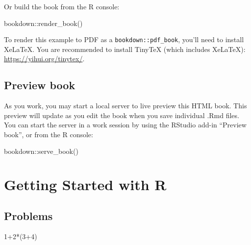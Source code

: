 \documentclass[
]{book}
\newenvironment{Shaded}{\begin{snugshade}}{\end{snugshade}}
\newcommand{\DecValTok}[1]{\textcolor[rgb]{0.00,0.00,0.81}{#1}}
\newcommand{\FunctionTok}[1]{\textcolor[rgb]{0.00,0.00,0.00}{#1}}
\newcommand{\NormalTok}[1]{#1}
\newcommand{\SpecialCharTok}[1]{\textcolor[rgb]{0.00,0.00,0.00}{#1}}
\theoremstyle{definition}
\theoremstyle{definition}
\theoremstyle{definition}
\theoremstyle{definition}
\theoremstyle{remark}
\begin{document}
Or build the book from the R console:

\begin{Shaded}
\begin{Highlighting}[]
\NormalTok{bookdown}\SpecialCharTok{::}\FunctionTok{render\_book}\NormalTok{()}
\end{Highlighting}
\end{Shaded}

To render this example to PDF as a \texttt{bookdown::pdf\_book}, you'll need to install XeLaTeX. You are recommended to install TinyTeX (which includes XeLaTeX): \url{https://yihui.org/tinytex/}.

\hypertarget{preview-book}{%
\section*{Preview book}\label{preview-book}}

As you work, you may start a local server to live preview this HTML book. This preview will update as you edit the book when you save individual .Rmd files. You can start the server in a work session by using the RStudio add-in ``Preview book'', or from the R console:

\begin{Shaded}
\begin{Highlighting}[]
\NormalTok{bookdown}\SpecialCharTok{::}\FunctionTok{serve\_book}\NormalTok{()}
\end{Highlighting}
\end{Shaded}

\hypertarget{getting-started-with-r}{%
\chapter{Getting Started with R}\label{getting-started-with-r}}

\hypertarget{problems}{%
\section{Problems}\label{problems}}

\begin{Shaded}
\begin{Highlighting}[]
\DecValTok{1}\SpecialCharTok{+}\DecValTok{2}\SpecialCharTok{*}\NormalTok{(}\DecValTok{3}\SpecialCharTok{+}\DecValTok{4}\NormalTok{)}
\end{Highlighting}
\end{Shaded}
\end{document}

